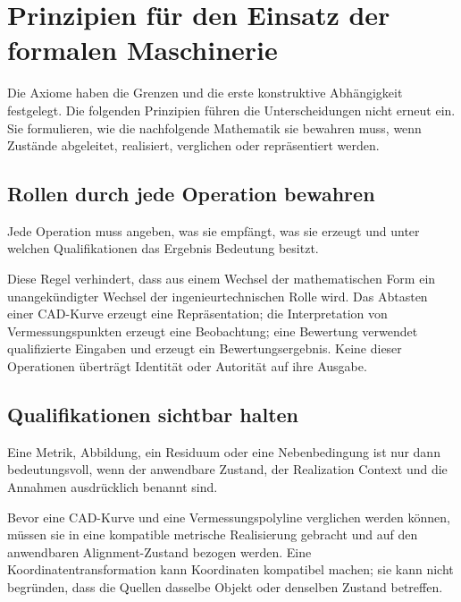 
\chapter{Prinzipien für den Einsatz der formalen Maschinerie}
\label{chap:architectural-principles}

Die Axiome haben die Grenzen und die erste konstruktive Abhängigkeit
festgelegt. Die folgenden Prinzipien führen die Unterscheidungen nicht erneut
ein. Sie formulieren, wie die nachfolgende Mathematik sie bewahren muss, wenn
Zustände abgeleitet, realisiert, verglichen oder repräsentiert werden.

\section{Rollen durch jede Operation bewahren}

\begin{principle}
\label{princ:typed-dependency}
Jede Operation muss angeben, was sie empfängt, was sie erzeugt und unter
welchen Qualifikationen das Ergebnis Bedeutung besitzt.
\end{principle}

Diese Regel verhindert, dass aus einem Wechsel der mathematischen Form ein
unangekündigter Wechsel der ingenieurtechnischen Rolle wird. Das Abtasten
einer CAD-Kurve erzeugt eine Repräsentation; die Interpretation von
Vermessungspunkten erzeugt eine Beobachtung; eine Bewertung verwendet
qualifizierte Eingaben und erzeugt ein Bewertungsergebnis. Keine dieser
Operationen überträgt Identität oder Autorität auf ihre Ausgabe.

\section{Qualifikationen sichtbar halten}

\begin{principle}
\label{princ:explicit-applicability}
Eine Metrik, Abbildung, ein Residuum oder eine Nebenbedingung ist nur dann
bedeutungsvoll, wenn der anwendbare Zustand, der Realization Context und die
Annahmen ausdrücklich benannt sind.
\end{principle}

Bevor eine CAD-Kurve und eine Vermessungspolyline verglichen werden können,
müssen sie in eine kompatible metrische Realisierung gebracht und auf den
anwendbaren Alignment-Zustand bezogen werden. Eine
Koordinatentransformation kann Koordinaten kompatibel machen; sie kann nicht
begründen, dass die Quellen dasselbe Objekt oder denselben Zustand betreffen.

